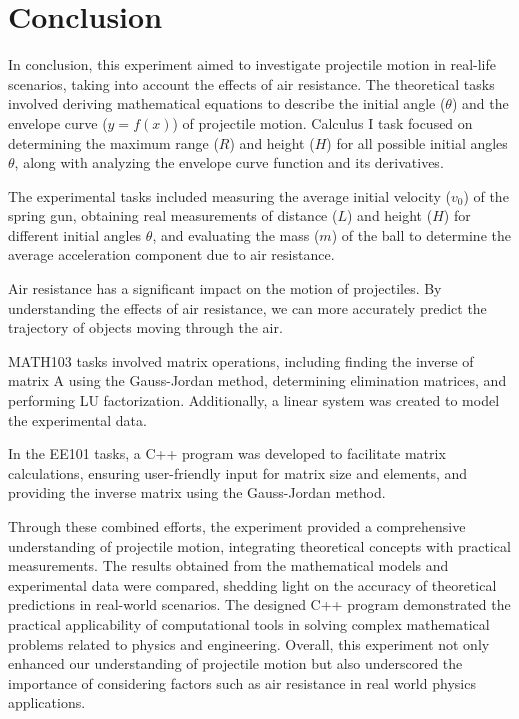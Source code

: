 \chapter{Conclusion}

In conclusion, this experiment aimed to investigate projectile motion in real-life
scenarios, taking into account the effects of air resistance. The theoretical tasks
involved deriving mathematical equations to describe the initial angle ($\theta$) and
the envelope curve ($y = f(x)$) of projectile motion. Calculus I task focused on
determining the maximum range ($R$) and height ($H$) for all possible initial angles
$\theta$, along with analyzing the envelope curve function and its derivatives.

The experimental tasks included measuring the average initial velocity ($v_0$) of
the spring gun, obtaining real measurements of distance ($L$) and height ($H$) for
different initial angles $\theta$, and evaluating the mass ($m$) of the ball to determine the
average acceleration component due to air resistance.

Air resistance has a significant impact on the motion of projectiles. By
understanding the effects of air resistance, we can more accurately predict the
trajectory of objects moving through the air.

MATH103 tasks involved matrix operations, including finding the inverse of
matrix A using the Gauss-Jordan method, determining elimination matrices, and
performing LU factorization. Additionally, a linear system was created to model
the experimental data.

In the EE101 tasks, a C++ program was developed to facilitate matrix
calculations, ensuring user-friendly input for matrix size and elements, and
providing the inverse matrix using the Gauss-Jordan method.

Through these combined efforts, the experiment provided a comprehensive
understanding of projectile motion, integrating theoretical concepts with
practical measurements. The results obtained from the mathematical models and
experimental data were compared, shedding light on the accuracy of theoretical
predictions in real-world scenarios. The designed C++ program demonstrated
the practical applicability of computational tools in solving complex
mathematical problems related to physics and engineering. Overall, this
experiment not only enhanced our understanding of projectile motion but also
underscored the importance of considering factors such as air resistance in real
world physics applications.
